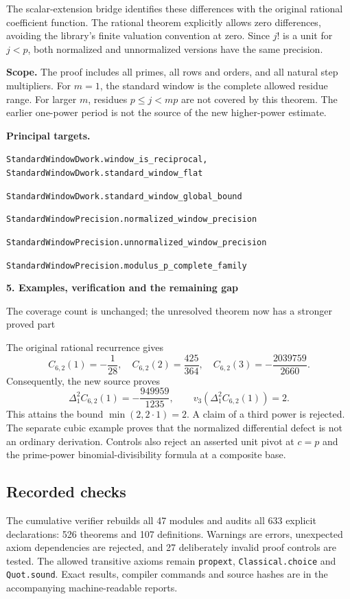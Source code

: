 \documentclass[11pt]{article}
\newcommand{\target}[1]{{\footnotesize\texttt{#1}}}
\newcommand{\pageheading}[2]{{\Large\bfseries\color{ink}#1}\par{\small #2}\par\medskip}
\begin{document}
The scalar-extension bridge identifies these differences with the original rational coefficient function. The rational theorem explicitly allows zero differences, avoiding the library's finite valuation convention at zero. Since $j!$ is a unit for $j<p$, both normalized and unnormalized versions have the same precision.

\textbf{Scope.} The proof includes all primes, all rows and orders, and all natural step multipliers. For $m=1$, the standard window is the complete allowed residue range. For larger $m$, residues $p\le j<mp$ are not covered by this theorem. The earlier one-power period is not the source of the new higher-power estimate.

\textbf{Principal targets.}\par
\target{StandardWindowDwork.window\_is\_reciprocal, StandardWindowDwork.standard\_window\_flat}\par
\target{StandardWindowDwork.standard\_window\_global\_bound}\par
\target{StandardWindowPrecision.normalized\_window\_precision}\par
\target{StandardWindowPrecision.unnormalized\_window\_precision}\par
\target{StandardWindowPrecision.modulus\_p\_complete\_family}

\newpage
\pageheading{5. Examples, verification and the remaining gap}{The coverage count is unchanged; the unresolved theorem now has a stronger proved part}
The original rational recurrence gives
\[
 C_{6,2}(1)=-\frac1{28},\quad C_{6,2}(2)=\frac{425}{364},\quad
 C_{6,2}(3)=-\frac{2039759}{2660}.
\]
Consequently, the new source proves
\[
 \Delta_1^2 C_{6,2}(1)=-\frac{949959}{1235},\qquad
 v_3\!\left(\Delta_1^2 C_{6,2}(1)\right)=2.
\]
This attains the bound $\min(2,2\cdot1)=2$. A claim of a third power is rejected. The separate cubic example proves that the normalized differential defect is not an ordinary derivation. Controls also reject an asserted unit pivot at $c=p$ and the prime-power binomial-divisibility formula at a composite base.

\subsection*{Recorded checks}
The cumulative verifier rebuilds all 47 modules and audits all 633 explicit declarations: 526 theorems and 107 definitions. Warnings are errors, unexpected axiom dependencies are rejected, and 27 deliberately invalid proof controls are tested. The allowed transitive axioms remain \texttt{propext}, \texttt{Classical.choice} and \texttt{Quot.sound}. Exact results, compiler commands and source hashes are in the accompanying machine-readable reports.
\end{document}
